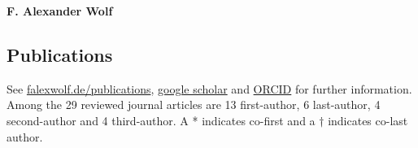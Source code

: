 \documentclass[11pt]{scrartcl}
\def\newline{\\[.4em]}
\begin{document}
\thispagestyle{firstpage}
\pagestyle{fancy}
\vspace*{1em}
\begin{center}\textbf{\LARGE{F. Alexander Wolf}}\end{center}


\setlength\LTleft{0em}
\subsection*{Publications}
See \href{https://falexwolf.de/publications}{falexwolf.de/publications}, \href{http://scholar.google.de/citations?user=1FnOtMoAAAAJ\&hl=en}{google scholar} and  \href{http://orcid.org/0000-0002-8760-7838}{ORCID} for further information. Among the 29 reviewed journal articles are 13 first-author, 6 last-author, 4 second-author and 4 third-author. A * indicates co-first and a $\dagger$ indicates co-last author.
\def\newline{\\[.6em]}


\newpage
\vspace{0em}

\end{document}
